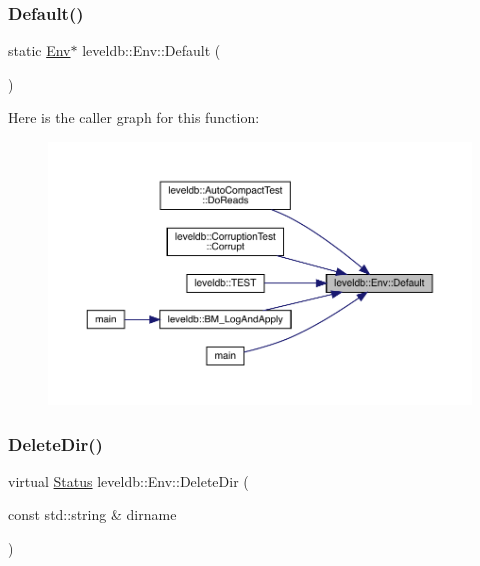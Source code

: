 \subsubsection{\texorpdfstring{Default()}{Default()}}
{\footnotesize\ttfamily static \mbox{\hyperlink{classleveldb_1_1_env}{Env}}$\ast$ leveldb\+::\+Env\+::\+Default (\begin{DoxyParamCaption}{ }\end{DoxyParamCaption})\hspace{0.3cm}{\ttfamily [static]}}

Here is the caller graph for this function\+:
\nopagebreak
\begin{figure}[H]
\begin{center}
\leavevmode
\includegraphics[width=350pt]{classleveldb_1_1_env_ab25f3129d5bc63cf3418d362e0e35912_icgraph}
\end{center}
\end{figure}
\mbox{\label{classleveldb_1_1_env_a4e1a1c4495541e426b146cba56c59627}} 
\subsubsection{\texorpdfstring{DeleteDir()}{DeleteDir()}}
{\footnotesize\ttfamily virtual \mbox{\hyperlink{classleveldb_1_1_status}{Status}} leveldb\+::\+Env\+::\+Delete\+Dir (\begin{DoxyParamCaption}\item[{const std\+::string \&}]{dirname }\end{DoxyParamCaption})\hspace{0.3cm}{\ttfamily [pure virtual]}}



